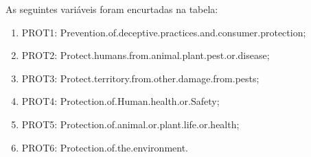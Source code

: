 As seguintes variáveis foram encurtadas na tabela:
\begin{enumerate}
  \item PROT1: Prevention.of.deceptive.practices.and.consumer.protection;
  \item PROT2: Protect.humans.from.animal.plant.pest.or.disease;
  \item PROT3: Protect.territory.from.other.damage.from.pests;
  \item PROT4: Protection.of.Human.health.or.Safety;
  \item PROT5: Protection.of.animal.or.plant.life.or.health;
  \item PROT6: Protection.of.the.environment.
\end{enumerate}